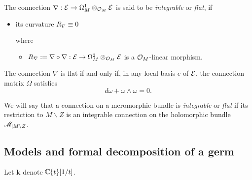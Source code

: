 \begin{defn}[Flatness (0.12.2)]
  The connection $\nabla:\mathcal{E}\to \Omega_M^1\otimes_{\mathcal{O}_M}\mathcal{E}$ is said to be
  \emph{integrable} or \emph{flat}, if
  \begin{itemize}
    \item its curvature $R_\nabla\equiv0$

    where
    \begin{itemize}
      \item $R_\nabla:=\nabla\circ\nabla:\mathcal{E}\to\Omega_M^2\otimes_{\mathcal{O}_M}\mathcal{E}$
        is a $\mathcal{O}_M$-linear morphism.
    \end{itemize}
  \end{itemize}
  \begin{prop}[0.12.4]
    The connection $\nabla$ is flat if and only if, in any local basis $e$ of
    $\mathcal{E}$, the connection matrix $\Omega$ satisfies
    \[
      d\omega + \omega \wedge \omega = 0.
    \]
  \end{prop}
  We will say that a connection on a meromorphic bundle is \emph{integrable} or
  \emph{flat} if its restriction to $M\backslash Z$ is an integrable connection
  on the holomorphic bundle $\mathscr{M}_{|M\backslash Z}$.
\end{defn}

\subsection{Models and formal decomposition of a germ}
Let $\textbf{k}$ denote $\mathbb{C}\{t\}[1/t]$.
